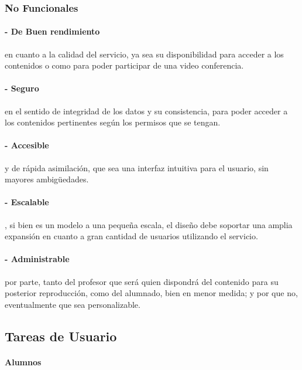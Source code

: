 \documentclass[12pt]{article}
\begin{document}
\newpage
\subsubsection{No Funcionales}

\paragraph{- De Buen rendimiento} en cuanto a la calidad del servicio, ya sea su disponibilidad para acceder a los 
contenidos o como para poder participar de una video conferencia.\\

\paragraph{- Seguro} en el sentido de integridad de los datos y su consistencia, para poder acceder a los contenidos
pertinentes según los permisos que se tengan.\\

\paragraph{- Accesible} y de rápida asimilación, que sea una interfaz intuitiva para el usuario, sin mayores
ambigüedades.\\

\paragraph{- Escalable}, si bien es un modelo a una peque\~na escala, el dise\~no debe soportar una amplia 
expansión en cuanto a gran cantidad de usuarios utilizando el servicio.\\

\paragraph{- Administrable} por parte, tanto del profesor que será quien dispondrá del contenido para su posterior
reproducción, como del alumnado, bien en menor medida; y por que no, eventualmente que sea personalizable.\\

\newpage
\subsection{Tareas de Usuario}
\paragraph{Alumnos\\}
\end{document}
